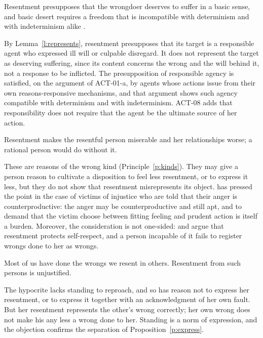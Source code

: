 \documentclass{situationist-preprint}
\begin{document}
\begin{objection}
Resentment presupposes that the wrongdoer deserves to suffer in a basic sense, and basic desert requires a freedom that is incompatible with determinism and with indeterminism alike \citep{Pereboom2001}.
\end{objection}

\begin{reply}
By Lemma~\ref{l:represents}, resentment presupposes that its target is a responsible agent who expressed ill will or culpable disregard. It does not represent the target as deserving suffering, since its content concerns the wrong and the will behind it, not a response to be inflicted. The presupposition of responsible agency is satisfied, on the argument of ACT-01-a, by agents whose actions issue from their own reasons-responsive mechanisms, and that argument shows such agency compatible with determinism and with indeterminism. ACT-08 adds that responsibility does not require that the agent be the ultimate source of her action.
\end{reply}

\begin{objection}[Uselessness]
Resentment makes the resentful person miserable and her relationships worse; a rational person would do without it.
\end{objection}

\begin{reply}
These are reasons of the wrong kind (Principle~\ref{p:kinds}). They may give a person reason to cultivate a disposition to feel less resentment, or to express it less, but they do not show that resentment misrepresents its object. \citet{Srinivasan2018} has pressed the point in the case of victims of injustice who are told that their anger is counterproductive: the anger may be counterproductive and still apt, and to demand that the victim choose between fitting feeling and prudent action is itself a burden. Moreover, the consideration is not one-sided: \citet{Butler1726} and \citet{MurphyHampton1988} argue that resentment protects self-respect, and a person incapable of it fails to register wrongs done to her as wrongs.
\end{reply}

\begin{objection}[Hypocrisy]
Most of us have done the wrongs we resent in others. Resentment from such persons is unjustified.
\end{objection}

\begin{reply}
The hypocrite lacks standing to reproach, and so has reason not to express her resentment, or to express it together with an acknowledgment of her own fault. But her resentment represents the other's wrong correctly; her own wrong does not make his any less a wrong done to her. Standing is a norm of expression, and the objection confirms the separation of Proposition~\ref{p:express}.
\end{reply}
\end{document}
